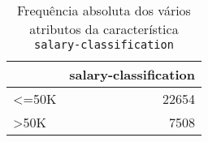 \begin{table}
\centering
\caption{Frequência absoluta dos vários atributos da característica \texttt{salary-classification}}
\begin{tabular}{lr}
\toprule
{} &  salary-classification \\
\midrule
 <=50K &                  22654 \\
 >50K  &                   7508 \\
\bottomrule
\end{tabular}
\end{table}

